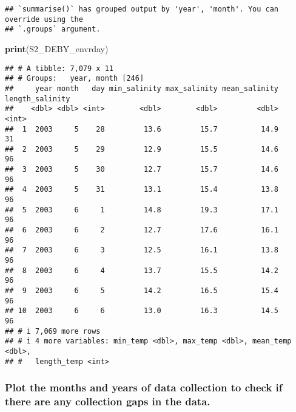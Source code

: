 \documentclass[
]{article}
\newenvironment{Shaded}{\begin{snugshade}}{\end{snugshade}}
\newcommand{\FunctionTok}[1]{\textcolor[rgb]{0.13,0.29,0.53}{\textbf{#1}}}
\newcommand{\NormalTok}[1]{#1}
\begin{document}
\begin{verbatim}
## `summarise()` has grouped output by 'year', 'month'. You can override using the
## `.groups` argument.
\end{verbatim}

\begin{Shaded}
\begin{Highlighting}[]
\FunctionTok{print}\NormalTok{(S2\_DEBY\_envrday)}
\end{Highlighting}
\end{Shaded}

\begin{verbatim}
## # A tibble: 7,079 x 11
## # Groups:   year, month [246]
##     year month   day min_salinity max_salinity mean_salinity length_salinity
##    <dbl> <dbl> <int>        <dbl>        <dbl>         <dbl>           <int>
##  1  2003     5    28         13.6         15.7          14.9              31
##  2  2003     5    29         12.9         15.5          14.6              96
##  3  2003     5    30         12.7         15.7          14.6              96
##  4  2003     5    31         13.1         15.4          13.8              96
##  5  2003     6     1         14.8         19.3          17.1              96
##  6  2003     6     2         12.7         17.6          16.1              96
##  7  2003     6     3         12.5         16.1          13.8              96
##  8  2003     6     4         13.7         15.5          14.2              96
##  9  2003     6     5         14.2         16.5          15.4              96
## 10  2003     6     6         13.0         16.3          14.5              96
## # i 7,069 more rows
## # i 4 more variables: min_temp <dbl>, max_temp <dbl>, mean_temp <dbl>,
## #   length_temp <int>
\end{verbatim}

\hypertarget{plot-the-months-and-years-of-data-collection-to-check-if-there-are-any-collection-gaps-in-the-data.}{%
\subsubsection{Plot the months and years of data collection to check if
there are any collection gaps in the
data.}\label{plot-the-months-and-years-of-data-collection-to-check-if-there-are-any-collection-gaps-in-the-data.}}
\end{document}
